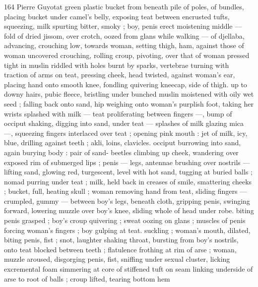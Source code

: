 164 Pierre Guyotat
green plastic bucket from beneath pile of poles, of bundles, placing
bucket under camel's belly, exposing teat between encrusted tufts,
squeezing, milk spurting bitter, smoky ; boy, penis erect moistening
middle — fold of dried jissom, over crotch, oozed from glans while
walking — of djellaba, advancing, crouching low, towards woman,
setting thigh, ham, against those of woman uncovered crouching,
rolling croup, pivoting, over that of woman pressed tight in muslin
riddled with holes burnt by sparks, vertebrae turning with traction of
arms on teat, pressing cheek, head twisted, against woman's ear,
placing hand onto smooth knee, fondling quivering kneecap, side of
thigh. up to downy hairs, pubic fleece, bristling under bunched
muslin moistened with oily wet seed ; falling back onto sand, hip
weighing onto woman's purplish foot, taking her wrists splashed with
milk — teat proliferating between fingers —, bump of occiput
shaking, digging into sand, under teat — splashes of milk glazing
mica —, squeezing fingers interlaced over teat ; opening pink mouth
: jet of milk, icy, blue, drilling against teeth ; akli, loins, clavicles.
occiput burrowing into sand, again burying body : pair of sand-
beetles climbing up cheek, wandering over exposed rim of
submerged lips ; penis — legs, antennae brushing over nostrils —
lifting sand, glowing red, turgescent, level with hot sand, tugging at
buried balls ; nomad purring under teat ; milk, held back in creases
of smile, smattering cheeks ; bucket, full, heating skull ; woman
removing hand from teat, sliding fingers — crumpled, gummy —
between boy's legs, beneath cloth, gripping penis, swinging forward,
lowering muzzle over boy's knee, sliding whole of head under robe.
biting penis grasped ; boy's croup quivering ; sweat oozing on glans
; muscles of penis forcing woman's fingers ; boy gulping at teat.
suckling ; woman's mouth, dilated, biting penis, fist ; snot, laughter
shaking throat, bursting from boy's nostrils, onto teat blocked
between teeth ; flatulence frothing at rim of arse ; woman, muzzle
aroused, disgorging penis, fist, sniffing under sexual cluster, licking
excremental foam simmering at core of stiffened tuft on seam linking
underside of arse to root of balls ; croup lifted, tearing bottom hem

